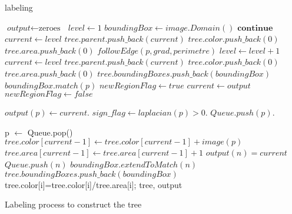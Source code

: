 \begin{algorithm}
\caption{labeling}\label{al:labeling}
\begin{algorithmic}[1]
\State $\textit{output} \gets \text{zeroes }$
\State $ level \gets 1$
\State $ boundingBox \gets image.Domain()$
 $\textbf{continue}$
\EndIf
{}
	\State $current \gets level$
	\State $tree.parent.push\_back(current)$
	\State $tree.color.push\_back(0)$
	\State $tree.area.push\_back(0)$
\Else
	\State $followEdge(p,grad,perimetre)$
		\State $ level \gets level+1$
		\State $ current \gets level$
		\State $tree.parent.push\_back(current)$
		\State $tree.color.push\_back(0)$
		\State $tree.area.push\_back(0)$
		\State $tree.boundingBoxes.push\_back(boundingBox)$		
		\State $boundingBox.match(p)$
		\State $newRegionFlag \gets true$		
	\Else
		\State $current \gets output$
		\State $newRegionFlag \gets false$
	\EndIf
\EndIf

\State $output(p) \gets current $.
\State $sign\_flag \gets laplacian(p)>0$.
\State $Queue.push(p)$.

	\State p $\gets$ Queue.pop()
	\State $tree.color[current-1] \gets tree.color[current-1] + image(p) $
	\State $tree.area[current-1] \gets tree.area[current-1] + 1$
			\State $output(n) = current$
			\State $Queue.push(n)$
			\State $boundingBox.extendToMatch(n)$
		\EndIf			
	\EndFor
\EndWhile
\EndFor
\State $tree.boundingBoxes.push\_back(boundingBox)$
	\State tree.color[i]=tree.color[i]/tree.area[i];
\EndFor
\State \Return tree, output
\EndProcedure
\end{algorithmic}
\caption{Labeling process to construct the tree}
\end{algorithm}

